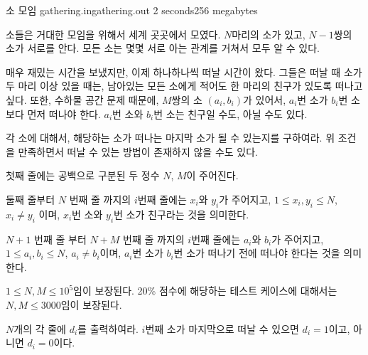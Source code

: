 \begin{problem}{소 모임}
	{gathering.in}{gathering.out}
	{2 seconds}{256 megabytes}{}
	
	소들은 거대한 모임을 위해서 세계 곳곳에서 모였다. $N$마리의 소가 있고, $N-1$쌍의 소가 서로를 안다. 모든 소는 몇몇 서로 아는 관계를 거쳐서 모두 알 수 있다.

	매우 재밌는 시간을 보냈지만, 이제 하나하나씩 떠날 시간이 왔다. 그들은 떠날 때 소가 두 마리 이상 있을 때는, 남아있는 모든 소에게 적어도 한 마리의 친구가 있도록 떠나고 싶다. 또한, 수하물 공간 문제 때문에, $M$쌍의 소 $(a_i, b_i)$가 있어서, $a_i$번 소가 $b_i$번 소보다 먼저 떠나야 한다. $a_i$번 소와 $b_i$번 소는 친구일 수도, 아닐 수도 있다.

	각 소에 대해서, 해당하는 소가 떠나는 마지막 소가 될 수 있는지를 구하여라. 위 조건을 만족하면서 떠날 수 있는 방법이 존재하지 않을 수도 있다.

	\InputFile
	
	첫째 줄에는 공백으로 구분된 두 정수 $N$, $M$이 주어진다.

	둘째 줄부터 $N$ 번째 줄 까지의 $i$번째 줄에는 $x_i$와 $y_i$가 주어지고, $1 \le x_i, y_i \le N$, $x_i \ne y_i$ 이며, $x_i$번 소와 $y_i$번 소가 친구라는 것을 의미한다.

	$N+1$ 번째 줄 부터 $N+M$ 번째 줄 까지의 $i$번째 줄에는 $a_i$와 $b_i$가 주어지고, $1 \le a_i, b_i \le N$, $a_i \ne b_i$이며, $a_i$번 소가 $b_i$번 소가 떠나기 전에 떠나야 한다는 것을 의미한다.

	$1 \le N, M \le 10^5$임이 보장된다. 20\% 점수에 해당하는 테스트 케이스에 대해서는 $N, M \le 3000$임이 보장된다.

	\OutputFile
	
	$N$개의 각 줄에 $d_i$를 출력하여라. $i$번째 소가 마지막으로 떠날 수 있으면 $d_i=1$이고, 아니면 $d_i=0$이다.
	
	\Examples
		
	\begin{example}
	\end{example}

	
	
	
\end{problem}

